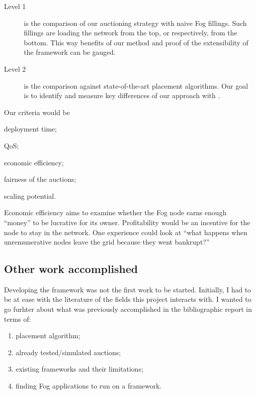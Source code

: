 \begin{description}
	\item[Level 1]{is the comparison of our auctioning strategy with naive Fog fillings. Such fillings are loading the network from the top, or respectively, from the bottom. This way benefits of our method and proof of the extensibility of the framework can be gauged.}
	\item[Level 2]{is the comparison against state-of-the-art placement algorithms. Our goal is to identify and measure key differences of our approach with \cite{tasiopoulos_fogspot_2019, bermbach_auctionwhisk_2021}.}
\end{description}

Our criteria would be
\begin{enumerate*}[(1)]
	\item deployment time;
	\item \gls{QoS};
	\item economic efficiency;
	\item fairness of the auctions;
	\item scaling potential.
\end{enumerate*}

Economic efficiency aims to examine whether the Fog node earns enough “money” to be lucrative for its owner. Profitability would be an incentive for the node to stay in the network. One experience could look at “what happens when unremunerative nodes leave the grid because they went bankrupt?”

\subsection{Other work accomplished}

Developing the framework was not the first work to be started. Initially, I had to be at ease with the literature of the fields this project interacts with. I wanted to go furhter about what was previously accomplished in the bibliographic report in terms of:
\begin{enumerate}
	\item placement algorithm;\label{enumerate:placement}
	\item already tested/simulated auctions;\label{enumerate:alreadytested}
	\item existing frameworks and their limitations;\label{enumerate:frameworklimitations}
	\item finding Fog applications to run on a framework.\label{enumerate:fogapplications}
\end{enumerate}

